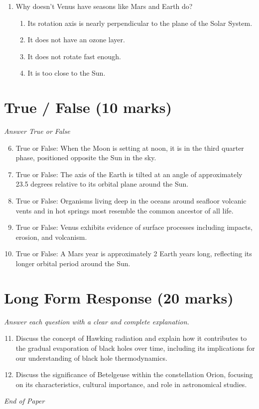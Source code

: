 \documentclass[12pt]{article}
\begin{document}
\begin{enumerate}[label=\arabic*.]
\begin{enumerate}[label=(\alph*)]
    \item From fragments of planets ejected by impacts
    \item From dust grains that escape from passing comets
    \item From accretion within the solar nebula at the same time the planets formed
\end{enumerate}
\item Why doesn't Venus have seasons like Mars and Earth do?
\begin{enumerate}[label=(\alph*)]
    \item Its rotation axis is nearly perpendicular to the plane of the Solar System.
    \item It does not have an ozone layer.
    \item It does not rotate fast enough.
    \item It is too close to the Sun.
\end{enumerate}
\end{enumerate}

\section*{True / False (10 marks)}
\textit{Answer True or False}
\begin{enumerate}[label=\arabic*.]
\setcounter{enumi}{5}
\item True or False: When the Moon is setting at noon, it is in the third quarter phase, positioned opposite the Sun in the sky.
\item True or False: The axis of the Earth is tilted at an angle of approximately 23.5 degrees relative to its orbital plane around the Sun.
\item True or False: Organisms living deep in the oceans around seafloor volcanic vents and in hot springs most resemble the common ancestor of all life.
\item True or False: Venus exhibits evidence of surface processes including impacts, erosion, and volcanism.
\item True or False: A Mars year is approximately 2 Earth years long, reflecting its longer orbital period around the Sun.
\end{enumerate}

\section*{Long Form Response (20 marks)}
\textit{Answer each question with a clear and complete explanation.}
\begin{enumerate}[label=\arabic*.]
\setcounter{enumi}{10}
\item Discuss the concept of Hawking radiation and explain how it contributes to the gradual evaporation of black holes over time, including its implications for our understanding of black hole thermodynamics.
\item Discuss the significance of Betelgeuse within the constellation Orion, focusing on its characteristics, cultural importance, and role in astronomical studies.
\end{enumerate}

\vfill
\noindent\textit{End of Paper}
\end{document}
